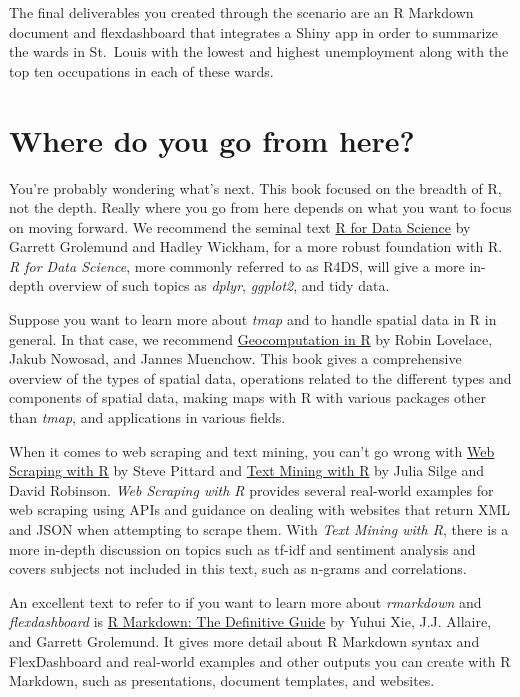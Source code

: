 \documentclass[
  krantz2]{krantz}
\begin{document}
The final deliverables you created through the scenario are an R Markdown document and flexdashboard that integrates a Shiny app in order to summarize the wards in St.~Louis with the lowest and highest unemployment along with the top ten occupations in each of these wards.

\hypertarget{where-do-you-go-from-here}{%
\section{Where do you go from here?}\label{where-do-you-go-from-here}}

You're probably wondering what's next. This book focused on the breadth of R, not the depth. Really where you go from here depends on what you want to focus on moving forward. We recommend the seminal text \href{https://r4ds.had.co.nz/}{R for Data Science} by Garrett Grolemund and Hadley Wickham, for a more robust foundation with R. \emph{R for Data Science}, more commonly referred to as R4DS, will give a more in-depth overview of such topics as \emph{dplyr}, \emph{ggplot2}, and tidy data.

Suppose you want to learn more about \emph{tmap} and to handle spatial data in R in general. In that case, we recommend \href{https://geocompr.robinlovelace.net/}{Geocomputation in R} by Robin Lovelace, Jakub Nowosad, and Jannes Muenchow. This book gives a comprehensive overview of the types of spatial data, operations related to the different types and components of spatial data, making maps with R with various packages other than \emph{tmap}, and applications in various fields.

When it comes to web scraping and text mining, you can't go wrong with \href{https://steviep42.github.io/webscraping/book/}{Web Scraping with R} by Steve Pittard and \href{https://www.tidytextmining.com/index.html}{Text Mining with R} by Julia Silge and David Robinson. \emph{Web Scraping with R} provides several real-world examples for web scraping using APIs and guidance on dealing with websites that return XML and JSON when attempting to scrape them. With \emph{Text Mining with R}, there is a more in-depth discussion on topics such as tf-idf and sentiment analysis and covers subjects not included in this text, such as n-grams and correlations.

An excellent text to refer to if you want to learn more about \emph{rmarkdown} and \emph{flexdashboard} is \href{https://bookdown.org/yihui/rmarkdown/}{R Markdown: The Definitive Guide} by Yuhui Xie, J.J. Allaire, and Garrett Grolemund. It gives more detail about R Markdown syntax and FlexDashboard and real-world examples and other outputs you can create with R Markdown, such as presentations, document templates, and websites.
\end{document}

